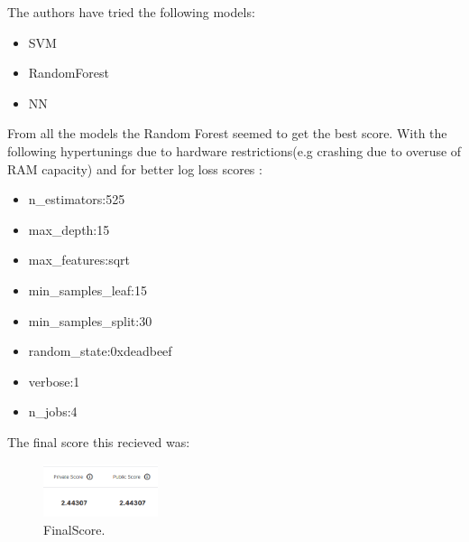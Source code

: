 \documentclass[../Main.tex]{subfiles}
\begin{document}
The authors have tried the following models:
\begin{itemize}
	\item SVM
	\item RandomForest
	\item NN
\end{itemize}
From all the models the Random Forest seemed to get the best score. With the following hypertunings due to hardware restrictions(e.g crashing due to overuse of RAM capacity) and for better log loss scores :\\
\begin{itemize}
	\item n\_estimators:525
	\item max\_depth:15
	\item max\_features:sqrt
	\item min\_samples\_leaf:15
	\item min\_samples\_split:30
	\item random\_state:0xdeadbeef
	\item verbose:1
	\item n\_jobs:4
\end{itemize}   
The final score this recieved was:
\begin{figure}[H]
\centering
\includegraphics[width=0.3\textwidth]{Resources/FinalScore.png}
\caption{\label{fig:FinalScore}FinalScore.}
\end{figure}
\end{document}
